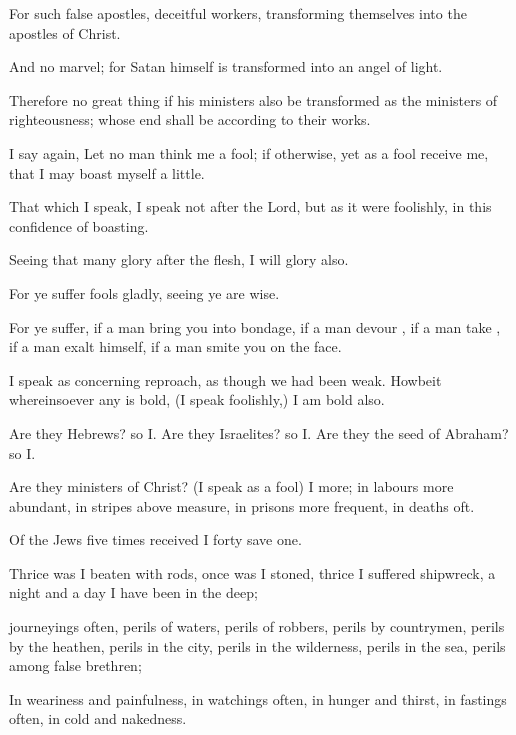 {For
such
{} false
apostles,
deceitful
workers, transforming
themselves
into the
apostles of
Christ.

And
no
marvel;
for
Satan
himself is
transformed
into an
angel of
light.

Therefore
{}
no great
thing
if
his
ministers
also be
transformed
as the
ministers of
righteousness;
whose
end shall
be according
to
their
works.


\par }{\PP {}I
say
again,
Let
no
man
think
me a
fool;
if
otherwise,
yet
as a
fool
receive
me,
that I may boast
myself a
little.

That
which I
speak, I
speak
{}
not
after the
Lord,
but as it
were
foolishly,
in
this
confidence of
boasting.

Seeing
that
many
glory
after the
flesh,
I will
glory
also.

For ye
suffer
fools
gladly, seeing
ye
{} are
wise.

For ye
suffer,
if a
man
bring
you into
bondage,
if a
man
devour
{},
if a
man
take
{},
if a
man exalt
himself,
if a
man
smite
you
on the
face.

I
speak as
concerning
reproach,
as
though
we had been
weak.
Howbeit
whereinsoever
any is
bold, (I
speak
foolishly,)
I am
bold
also.

Are
they
Hebrews?
so
{}
I. Are
they
Israelites?
so
{}
I. Are
they the
seed of
Abraham?
so
{}
I.

Are
they
ministers of
Christ? (I
speak as a
fool)
I
{}
more;
in
labours more
abundant,
in
stripes above
measure,
in
prisons more
frequent,
in
deaths
oft.

Of the
Jews five
times received
I
forty
{}
save
one.

Thrice was I beaten with
rods,
once was I
stoned,
thrice I suffered
shipwreck, a night and a
day I have
been
in the
deep;

journeyings
often,
{}
perils of
waters,
{}
perils of
robbers,
{}
perils
by
{}
countrymen,
{}
perils
by the
heathen,
{}
perils
in the
city,
{}
perils
in the
wilderness,
{}
perils
in the
sea,
{}
perils
among false
brethren;

In
weariness
and
painfulness,
in
watchings
often,
in
hunger
and
thirst,
in
fastings
often,
in
cold
and
nakedness.

}
